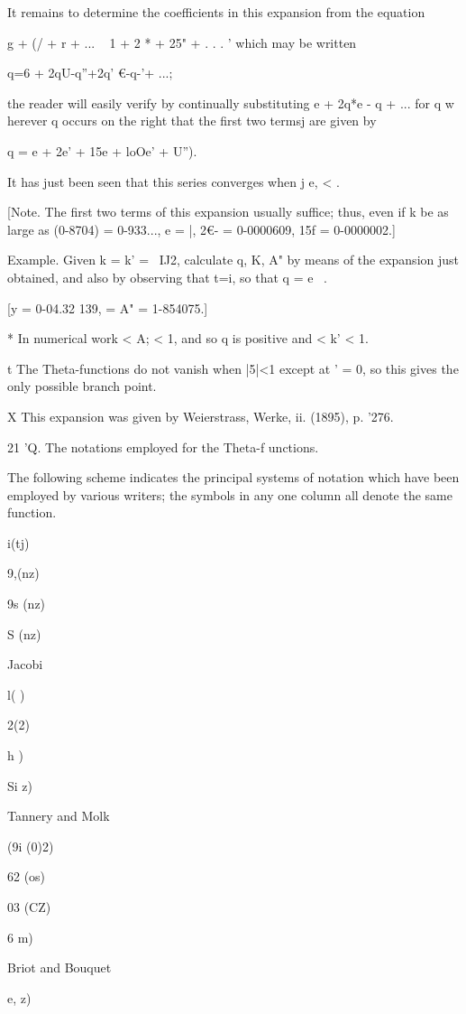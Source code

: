 It remains to determine the coefficients in this expansion from the
equation

g + (/ + r + ... ~ 1 + 2 * + 25" + . . . ' which may be written

q=6 + 2qU-q''+2q' €-q-'+ ...;

the reader will easily verify by continually substituting e + 2q*e - q
+ ... for q w herever q occurs on the right that the first two termsj
are given by

q = e + 2e' + 15e + loOe' + U'').

It has just been seen that this series converges when j e, < .

[Note. The first two terms of this expansion usually suffice; thus,
even if k be as large as (0-8704) = 0-933..., e = |, 2€- = 0-0000609,
15f = 0-0000002.]

Example. Given k = k' = \ IJ2, calculate q, K, A" by means of the
expansion just obtained, and also by observing that t=i, so that q =
e~ .

[y = 0-04.32 139, = A" = 1-854075.]

* In numerical work < A; < 1, and so q is positive and < k' < 1.

t The Theta-functions do not vanish when |5|<1 except at ' = 0, so
this gives the only possible branch point.

X This expansion was given by Weierstrass, Werke, ii. (1895), p. '276.

%
%

21 'Q. The notations employed for the Theta-f unctions.

The following scheme indicates the principal systems of notation which
have been employed by various writers; the symbols in any one column
all denote the same function.

 i(tj)

9,(nz)

9s (nz)

S (nz)

Jacobi

 l( )

 2(2)

h )

Si z)

Tannery and Molk

(9i (0)2)

62 (os)

03 (CZ)

6 m)

Briot and Bouquet

e, z)

